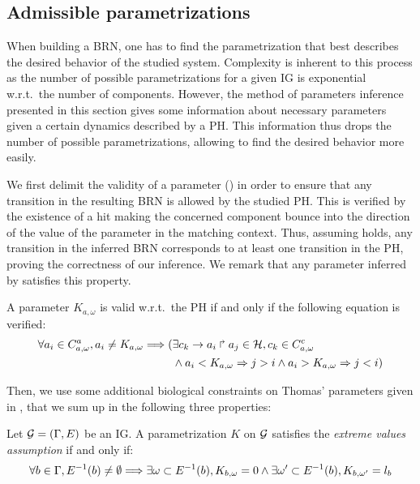 \subsection{Admissible parametrizations}\label{ssec:admissible-K}

When building a BRN, one has to find the parametrization that best describes the desired behavior of the studied system.
Complexity is inherent to this process as the number of possible parametrizations for a given IG is exponential w.r.t.~the number of components.
However, the method of parameters inference presented in this section gives some information about necessary parameters given a certain dynamics described by a PH.
This information thus drops the number of possible parametrizations, allowing to find the desired behavior more easily.

We first delimit the validity of a parameter () in order to ensure that any
transition in the resulting BRN is allowed by the studied PH.
This is verified by the existence of a hit making the concerned component bounce into the direction
of the value of the parameter in the matching context.
Thus, assuming  holds, any transition in the inferred BRN corresponds to at least
one transition in the PH, proving the correctness of our inference.
We remark that any parameter inferred by  satisfies this property.

\begin{property}\label{pro:K-valid}
A parameter $K_{a,\omega}$ is valid w.r.t.~the PH if and only if the following equation is verified:
\begin{align*}
  \forall a_i \in C^a_{a,\omega}, a_i \neq K_{a,\omega} \Longrightarrow
    (& \exists c_k\rightarrow a_i\Rsh a_j\in\mathcal{H}, c_k \in C^c_{a,\omega} \\
     & \wedge a_i < K_{a,\omega} \Rightarrow j > i \wedge  a_i > K_{a,\omega} \Rightarrow j <i )
\end{align*}
\end{property}

Then, we use some additional biological constraints on Thomas' parameters given in
\cite{BernotSemBRN}, that we sum up in the following three properties:

\begin{property}
Let $\mathcal{G} = (\Gamma, E)$ be an IG. A parametrization $K$ on $\mathcal{G}$ satisfies the \emph{extreme values assumption} if and only if:
\label{pro:param_enum_extreme}
\begin{align*}
  \forall b \in \Gamma, E^{-1}(b) \neq \emptyset \Longrightarrow
    \exists \omega \subset E^{-1}(b), K_{b,\omega} = 0 \wedge
    \exists \omega' \subset E^{-1}(b), K_{b,\omega'} = l_b
\end{align*}
\end{property}

